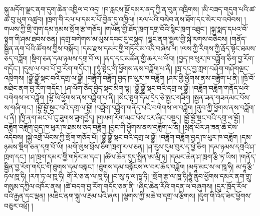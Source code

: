 སྐུ་མདོག་ལྗང་ནག་དུག་ཆེན་འཁྱིལ་བ་འདྲ། །ཁ་རླངས་སྔོ་དམར་ནད་ཀྱི་ན་བུན་འཁྲིགས། །མི་བཟད་གདུག་པའི་ཚ་ཚ་བུ་ཡུག་འཚུབ། །ཁྲག་གི་རལ་པ་དམར་པོ་གྱེན་དུ་འཁྱིལ། །རལ་པའི་བསེབ་ནས་ཐོག་དང་སེར་བ་འབེབས། །གཡས་ཀྱི་གྲི་གུག་དམ་ཉམས་སྲོག་རྩ་གཅོད། །གཡོན་གྱི་ཐོད་ཁྲག་དགྲ་བོའི་སྙིང་ཁྲག་འཐུང་། །སྐུ་སྨད་དཔའ་བོ་སྟག་གི་ཤམ་ཐབས་ཅན། །དགྲ་བགེགས་མ་ལུས་དབང་དུ་བསྡུད། །ལྗང་ནག་སྦྲུལ་གྱི་སྐེ་རགས་བཅིངས། །གནོད་སྦྱིན་ནག་པོའི་ཚོགས་ཀྱིས་བསྐོར། །དམ་རྫས་དམར་གྱི་གཏོར་མ་འདི་བཞེས་ལ། །ལས་ཀྱི་རིགས་ཀྱི་རྦོད་སྟོང་ཐམས་ཅད་བཟློག །སྡིག་ཅན་དམ་ཉམས་དགྲ་བོ་ལ། །ནད་དང་མཚོན་གྱི་ཆར་པ་ཕོབ། །བྱད་ཁ་ཕུར་ཁ་བཟློག་ཅིག་བྱ་རོག་གདོང་། །དུས་ལ་བབ་པོ་བྱ་རོག་གདོང་།། །།ཧཱུཾ་སྟེང་གི་ཕྱོགས་ནས་བཟློག་པ་ནི། །ཁྲ་དང་བྱ་ཀླག་བཤོག་གཤོགལྡང་འཁྲིགས། །བྷྱོ་བྷྱོ་སྡང་བའི་དགྲ་ལ་བྷྱོ། །བཟློག་བཟློག་བྱད་ཁ་ཕུར་ཁ་བཟློག །ཤར་གྱི་ཕྱོགས་ནས་བཟློག་པ་ནི། །ཁྲོ་བོ་མཐིང་ནག་བྱ་རོག་གདོང་། །ཤ་ལོག་ཅོད་བྱེད་སྡང་མིག་ལྟ། །བྷྱོ་བྷྱོ་སྡང་བའི་དགྲ་ལ་བྷྱོ། །བཟློག་བཟློག་གནོད་པའི་བགེགས་ལ་བཟློག །ལྷོ་ཡི་ཕྱོགས་ནས་བཟློག་པ་ནི། །སེང་སྟག་དོམ་དྲེད་ཅེ་སྤྱང་གཟིག །སྤྱན་ཟན་གཟནམང་བོས་ས་གཞི་གང་། །བྷྱོ་བྷྱོ་སྡང་བའི་དགྲ་ལ་བྷྱོ། །བཟློག་བཟློག་གནོད་པའི་བགེགས་ལ་བཟློག །ནུབ་ཀྱི་ཕྱོགས་ནས་བཟློག་པ་ནི། །ཁྱི་ནག་མང་པོ་ངུ་ཟུགས་ཟུགབྱེད། །གཡག་རོག་མང་པོས་ངར་ཞིང་བསྡུད། །བྷྱོ་བྷྱོ་སྡང་བའི་དགྲ་ལ་བྷྱོ། །བཟློག་བཟློག་བྱད་ཁ་ཕུར་ཁ་ཐམས་ཅད་བཟློག །བྱང་གི་ཕྱོགས་ནས་བཟློག་པ་ནི། །སྲིན་པོར་ཤ་ཟན་ཆོ་ངེས་འདེབས། །སྐྱེ་འགྲོ་ཡོངས་ཀྱི་སྲོག་གཅོད་པོ། །བྷྱོ་བྷྱོ་སྡང་བའི་དགྲ་ལ་བྷྱོ། །བཟློག་བཟློག་བྱད་ཁ་ཕུར་ཁ་བཟློག །དམ་ཉམས་སྡིག་ཅན་དགྲ་བོ་ཡི། །མགོ་ལུས་ཕྲོས་ཅིག་ཁྲག་རལ་ཅན། །ཤ་རུས་དུམ་བུར་ད་ཕྱེ་ཅིག །དམ་ཉམས་དགྲའི་ཤ་ཁྲག་དང་། །ཤ་ཁྲག་དམར་གྱི་གཏོར་མ་དང་། །ཚིལ་ཆོན་དུད་སྤྲིན་ཨ་མྲི་ཏ། །དམར་ཆེན་ཤ་ཁྲག་རྩི་ཏ་ཡིས། །གནོད་སྦྱིན་བྱ་རོག་གདོང་གི་ཐུགས་དམ་བསྐང་། །ཐུགས་དམ་བསྐོངས་ལ་བར་ཆོད་བཟློག །མཧཱ་མང་ས་ལ་ཁཱ་ཧི། མ་ཧཱ་རྩི་ཏལ་ཁཱ་ཧི། །རཀ་ཏ་ལ་ཁཱ་ཧི། གོ་རེ་ཅ་ན་ལ་ཁཱ་ཧི། །བ་སུ་ཏ་ལ་ཁཱ་ཧི། །སྲོག་རྩ་ལ་ཁཱ་ཧི།ཧཱུཾ་ནུབ་ཕྱོགས་དམར་ནག་གྲུ་གསུམ་དཀྱིལ་འཁོར་ནས། །ཚེ་བདག་བྱ་རོག་གདོང་ཅན་ནི། །ཞིང་ཆེན་རོའི་གདན་ལ་བཞུགས། །དུར་ཁྲོད་རོལ་བའི་རྒྱན་དང་ལྡན། །མཐིང་ནག་སྐུ་ལ་རྔམ་པའི་ཞལ། །ལྕགས་ཀྱི་མཆེ་བ་དགྲ་ལ་རྩིགས། །དུག་གི་འོད་ཟེར་ཕྱོགས་བཅུར་འཕྲོ། །
